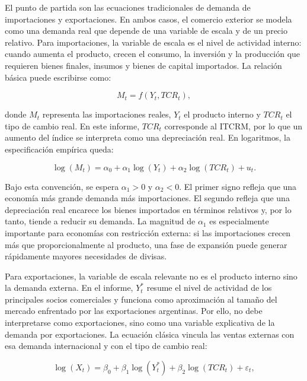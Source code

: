\documentclass[11pt,a4paper]{article}
\begin{document}
	El punto de partida son las ecuaciones tradicionales de demanda de
	importaciones y exportaciones. En ambos casos, el comercio exterior se modela
	como una demanda real que depende de una variable de escala y de un precio
	relativo. Para importaciones, la variable de escala es el nivel de actividad
	interno: cuando aumenta el producto, crecen el consumo, la inversión y la
	producción que requieren bienes finales, insumos y bienes de capital
	importados. La relación básica puede escribirse como:
	
	\begin{equation}
		M_t = f(Y_t, TCR_t),
	\end{equation}
	
	donde $M_t$ representa las importaciones reales, $Y_t$ el producto interno y
	$TCR_t$ el tipo de cambio real. En este informe, $TCR_t$ corresponde al ITCRM,
	por lo que un aumento del índice se interpreta como una depreciación real. En
	logaritmos, la especificación empírica queda:
	
	\begin{equation}
		\log(M_t) = \alpha_0 + \alpha_1 \log(Y_t) +
		\alpha_2 \log(TCR_t) + u_t.
		\label{eq:importaciones-largo-plazo}
	\end{equation}
	
	Bajo esta convención, se espera $\alpha_1>0$ y $\alpha_2<0$. El primer signo
	refleja que una economía más grande demanda más importaciones. El segundo
	refleja que una depreciación real encarece los bienes importados en términos
	relativos y, por lo tanto, tiende a reducir su demanda. La magnitud de
	$\alpha_1$ es especialmente importante para economías con restricción externa:
	si las importaciones crecen más que proporcionalmente al producto, una fase de
	expansión puede generar rápidamente mayores necesidades de divisas.

	Para exportaciones, la variable de escala relevante no es el producto interno
	sino la demanda externa. En el informe, $Y_t^*$ resume el nivel de actividad de
	los principales socios comerciales y funciona como aproximación al tamaño del
	mercado enfrentado por las exportaciones argentinas. Por ello, no debe
	interpretarse como exportaciones, sino como una variable explicativa de la
	demanda por exportaciones. La ecuación clásica vincula las ventas externas con
	esa demanda internacional y con el tipo de cambio real:
	
	\begin{equation}
		\log(X_t) = \beta_0 + \beta_1 \log(Y_t^*) +
		\beta_2 \log(TCR_t) + \varepsilon_t,
		\label{eq:exportaciones-largo-plazo}
	\end{equation}
	
\end{document}
